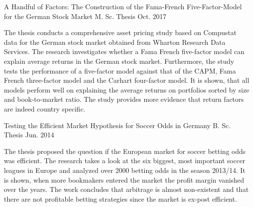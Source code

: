 

\begin{cventries}

  \cventry
    {A Handful of Factors: The Construction of the Fama-French Five-Factor-Model for the German Stock Market} %
    {M. Sc. Thesis}
    {} %
    {Oct. 2017} %
    {
      \begin{cvitems} %
        \item {The thesis conducts a comprehensive asset pricing study based on Compustat data for the German stock market obtained from Wharton Research Data Services. The research investigates whether a Fama French five-factor model can explain average returns in the German stock market. Furthermore, the study tests the performance of a five-factor model against that of the CAPM, Fama French three-factor model and the Carhart four-factor model. It is shown, that all models perform well on explaining the average returns on portfolios sorted by size and book-to-market ratio.  The study provides more evidence that return factors are indeed country specific.} %
      \end{cvitems}
    }


  \cventry
    {Testing the Efficient Market Hypothesis for Soccer Odds in Germany} %
    {B. Sc. Thesis}
    {} %
    {Jun. 2014} %
    {
      \begin{cvitems} %
        \item {The thesis proposed the question if the European market for soccer betting odds was efficient. The research takes a look at the six biggest, most important soccer leagues in Europe and analyzed over 2000 betting odds in the season 2013/14. It is shown, when more bookmakers entered the market the profit margin vanished over the years. The work concludes that arbitrage is almost non-existent and that there are not profitable betting strategies since the market is ex-post efficient.}
      \end{cvitems}
    }


\end{cventries}
